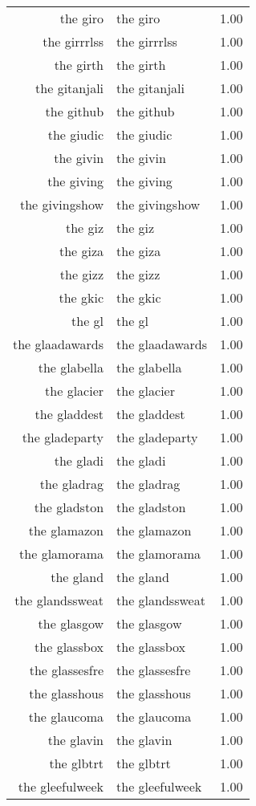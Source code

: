 \begin{table}[ht]
\begin{tabular}{rlr}
  the giro & the giro & 1.00 \\ 
  the girrrlss & the girrrlss & 1.00 \\ 
  the girth & the girth & 1.00 \\ 
  the gitanjali & the gitanjali & 1.00 \\ 
  the github & the github & 1.00 \\ 
  the giudic & the giudic & 1.00 \\ 
  the givin & the givin & 1.00 \\ 
  the giving & the giving & 1.00 \\ 
  the givingshow & the givingshow & 1.00 \\ 
  the giz & the giz & 1.00 \\ 
  the giza & the giza & 1.00 \\ 
  the gizz & the gizz & 1.00 \\ 
  the gkic & the gkic & 1.00 \\ 
  the gl & the gl & 1.00 \\ 
  the glaadawards & the glaadawards & 1.00 \\ 
  the glabella & the glabella & 1.00 \\ 
  the glacier & the glacier & 1.00 \\ 
  the gladdest & the gladdest & 1.00 \\ 
  the gladeparty & the gladeparty & 1.00 \\ 
  the gladi & the gladi & 1.00 \\ 
  the gladrag & the gladrag & 1.00 \\ 
  the gladston & the gladston & 1.00 \\ 
  the glamazon & the glamazon & 1.00 \\ 
  the glamorama & the glamorama & 1.00 \\ 
  the gland & the gland & 1.00 \\ 
  the glandssweat & the glandssweat & 1.00 \\ 
  the glasgow & the glasgow & 1.00 \\ 
  the glassbox & the glassbox & 1.00 \\ 
  the glassesfre & the glassesfre & 1.00 \\ 
  the glasshous & the glasshous & 1.00 \\ 
  the glaucoma & the glaucoma & 1.00 \\ 
  the glavin & the glavin & 1.00 \\ 
  the glbtrt & the glbtrt & 1.00 \\ 
  the gleefulweek & the gleefulweek & 1.00 \\ 

\end{tabular}
\end{table}
